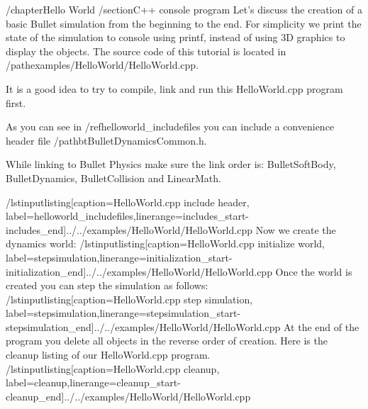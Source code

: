 /chapter{Hello World}
/section{C++ console program}
Let's discuss the creation of a basic Bullet simulation from the beginning to the end. For simplicity we print the state of the simulation to console using printf, instead of using 3D graphics to display the objects. The source code of this tutorial is located in /path{examples/HelloWorld/HelloWorld.cpp}. 

It is a good idea to try to compile, link and run this HelloWorld.cpp program first.

As you can see in /ref{helloworld_includefiles} you can include a convenience header file /path{btBulletDynamicsCommon.h}.

While linking to Bullet Physics make sure the link order is: BulletSoftBody, BulletDynamics, BulletCollision and LinearMath.

/lstinputlisting[caption=HelloWorld.cpp include header, label=helloworld_includefiles,linerange=includes_start-includes_end]{../../examples/HelloWorld/HelloWorld.cpp}
Now we create the dynamics world:
/lstinputlisting[caption=HelloWorld.cpp initialize world, label=stepsimulation,linerange=initialization_start-initialization_end]{../../examples/HelloWorld/HelloWorld.cpp}
Once the world is created you can step the simulation as follows:
/lstinputlisting[caption=HelloWorld.cpp step simulation, label=stepsimulation,linerange=stepsimulation_start-stepsimulation_end]{../../examples/HelloWorld/HelloWorld.cpp}
At the end of the program you delete all objects in the reverse order of creation. Here is the cleanup listing of our HelloWorld.cpp program.
/lstinputlisting[caption=HelloWorld.cpp cleanup, label=cleanup,linerange=cleanup_start-cleanup_end]{../../examples/HelloWorld/HelloWorld.cpp}
